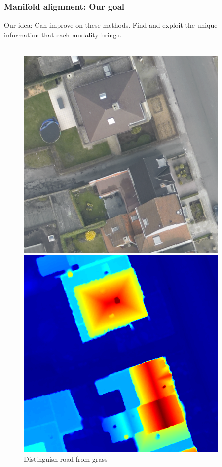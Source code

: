 \documentclass{beamer}
\begin{document}
\begin{frame}
  \frametitle{Manifold alignment: Our goal}
  
  Our idea: Can improve on these methods. Find and exploit the unique information that each modality brings.\\~\\
  \begin{figure}
    \hfill
    \begin{minipage}[b]{0.40\linewidth}
      \centering
      \includegraphics[width=\textwidth]{./Images/DFC2015/optical.png}
      \caption{Distinguish road from grass}
    \end{minipage}
    \hfill
    \begin{minipage}[b]{0.40\linewidth}
      \centering
      \includegraphics[width=\textwidth]{./Images/DFC2015/lidarColor.png}

\end{minipage}
\end{figure}
\end{frame}
\end{document}
